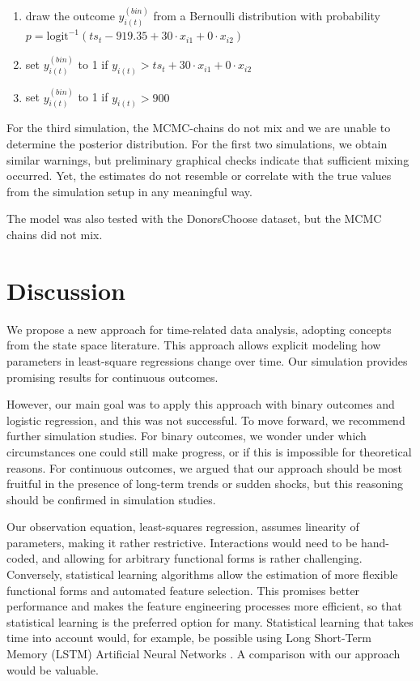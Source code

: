 \documentclass{article}
\begin{document}
\begin{enumerate}
    \item draw the outcome $y^{(bin)}_{i(t)}$ from a Bernoulli distribution with probability $p = \textrm{logit}^{-1}(ts_t - 919.35 + 30 \cdot x_{i1} + 0 \cdot x_{i2})$
    \item set $y^{(bin)}_{i(t)}$ to 1 if $y_{i(t)} > ts_t + 30 \cdot x_{i1} + 0 \cdot x_{i2}$
    \item set $y^{(bin)}_{i(t)}$ to 1 if $y_{i(t)} > 900$
\end{enumerate}

For the third simulation, the MCMC-chains do not mix and we are unable to determine the posterior distribution. For the first two simulations, we obtain similar warnings, but preliminary graphical checks indicate that sufficient mixing occurred. Yet, the estimates do not resemble or correlate with the true values from the simulation setup in any meaningful way.

The model was also tested with the DonorsChoose dataset, but the MCMC chains did not mix.

\section{Discussion}\label{sec:discussion}

We propose a new approach for time-related data analysis, adopting concepts from the state space literature. This approach allows explicit modeling how parameters in least-square regressions change over time. Our simulation provides promising results for continuous outcomes. 

However, our main goal was to apply this approach with binary outcomes and logistic regression, and this was not successful. To move forward, we recommend further simulation studies. For binary outcomes, we wonder under which circumstances one could still make progress, or if this is impossible for theoretical reasons. For continuous outcomes, we argued that our approach should be most fruitful in the presence of long-term trends or sudden shocks, but this reasoning should be confirmed in simulation studies.

Our observation equation, least-squares regression, assumes linearity of parameters, making it rather restrictive. Interactions would need to be hand-coded, and allowing for arbitrary functional forms is rather challenging. Conversely, statistical learning algorithms allow the estimation of more flexible functional forms and automated feature selection. This promises better performance and makes the feature engineering processes more efficient, so that statistical learning is the preferred option for many. Statistical learning that takes time into account would, for example, be possible using Long Short-Term Memory (LSTM) Artificial Neural Networks \citep{hochreiter_long_1997}. A comparison with our approach would be valuable.
\end{document}
